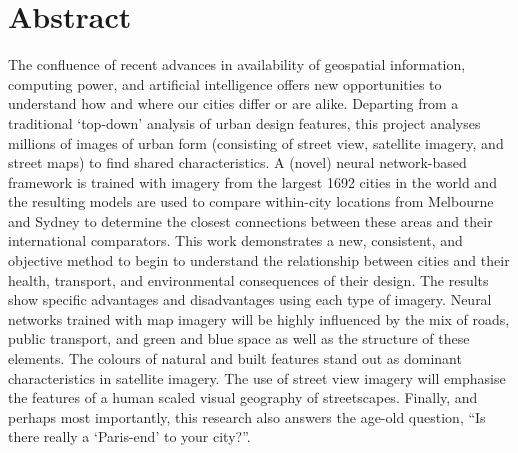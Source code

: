 \documentclass[10pt,letterpaper]{article}
\begin{document}
\section*{Abstract}
The confluence of recent advances in availability of geospatial information, computing power, and artificial intelligence offers new opportunities to understand how and where our cities differ or are alike. Departing from a traditional `top-down' analysis of urban design features, this project analyses millions of images of urban form (consisting of street view, satellite imagery, and street maps) to find shared characteristics. A (novel) neural network-based framework is trained with imagery from the largest 1692 cities in the world and the resulting models are used to compare within-city locations from Melbourne and Sydney to determine the closest connections between these areas and their international comparators. This work demonstrates a new, consistent, and objective method to begin to understand the relationship between cities and their health, transport, and environmental consequences of their design. The results show specific advantages and disadvantages using each type of imagery. Neural networks trained with map imagery will be highly influenced by the mix of roads, public transport, and green and blue space as well as the structure of these elements. The colours of natural and built features stand out as dominant characteristics in satellite imagery. The use of street view imagery will emphasise the features of a human scaled visual geography of streetscapes. Finally, and perhaps most importantly, this research also answers the age-old question, ``Is there really a `Paris-end' to your city?''.

\end{document}
